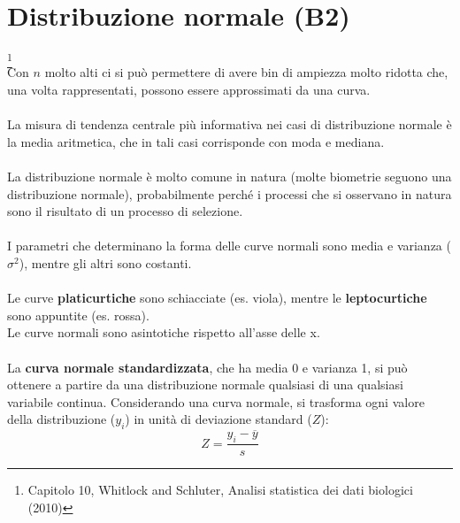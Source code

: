\documentclass[drafts, 10pt]{book}
\begin{document}
\chapter{Distribuzione normale (B2)} \footnote{Capitolo 10, Whitlock and Schluter, Analisi statistica dei dati biologici (2010)}
\\
Con $n$ molto alti ci si può permettere di avere bin di ampiezza molto ridotta che, una volta rappresentati, possono essere approssimati da una curva.
\\
\\
La misura di tendenza centrale più informativa nei casi di distribuzione normale è la media aritmetica, che in tali casi corrisponde con moda e mediana.
\\
\\
La distribuzione normale è molto comune in natura (molte biometrie seguono una distribuzione normale), probabilmente perché i processi che si osservano in natura sono il risultato di un processo di selezione.
\\
\\
I parametri che determinano la forma delle curve normali sono media e varianza ($\sigma^2$), mentre gli altri sono costanti.
\\
\\
Le curve \textbf{platicurtiche} sono schiacciate (es. viola), mentre le  \textbf{leptocurtiche} sono appuntite (es. rossa).
\\
Le curve normali sono asintotiche rispetto all’asse delle x.
\\
\\
La \textbf{curva normale standardizzata}, che ha media 0 e varianza 1, si può ottenere a partire da una distribuzione normale qualsiasi di una qualsiasi variabile continua. Considerando una curva normale, si trasforma ogni valore della distribuzione ($y_i$) in unità di deviazione standard ($Z$):
\begin{equation}
    Z = \frac{y_i - \overline{y}}{s}
\end{equation}
\end{document}
